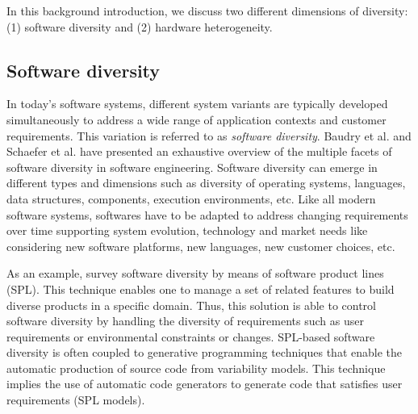 In this background introduction, we discuss two different dimensions of diversity: (1) software diversity and (2) hardware heterogeneity.

 
 
\subsection{Software diversity}
In today’s software systems, different system variants are typically developed simultaneously to address a wide range of application contexts and customer requirements\cite{schaefer2012software}. 
This variation is referred to as \textit{software diversity}. 
Baudry et al.\cite{baudry2015multiple} and Schaefer et al.\cite{schaefer2012software} have presented an exhaustive overview of the multiple facets of software diversity in software engineering. 
Software diversity can emerge in different types and dimensions such as diversity of operating systems, languages, data structures, components, execution environments, etc. 
Like all modern software systems, softwares have to be adapted to address changing requirements over time supporting system evolution, technology and market needs like considering new software platforms, new languages, new customer choices, etc.

As an example, \cite{schaefer2012software} survey software diversity by means of software product lines (SPL). This technique enables one to manage a set of related features to build diverse products in a specific domain. Thus, this solution is able to control software diversity by handling the diversity of requirements such as user requirements or environmental constraints or changes. SPL-based software diversity is often coupled to generative programming techniques\cite{Czarnecki:2000:GPM:345203} that enable the automatic production of source code from variability models. This technique implies the use of automatic code generators to generate code that satisfies user requirements (SPL models).

